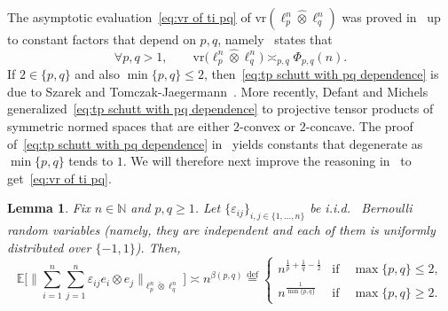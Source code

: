 \documentclass[11pt,reqno]{amsart}
\renewcommand{\le}{\leqslant}
\renewcommand{\ge}{\geqslant}
\newcommand{\vr}{\mathrm{vr}}
\newcommand{\n}{\{1,\ldots,n\}}
\newcommand{\e}{\varepsilon}
\newtheorem{lemma}[theorem]{Lemma}
\theoremstyle{remark}
\newcommand{\E}{\mathbb{ E}}
\newcommand{\N}{\mathbb N}
\newcommand{\eqdef}{\stackrel{\mathrm{def}}{=}}
\renewcommand{\1}{\mathbf 1}
\newcommand{\tp}{\hat{\otimes}}
\newcommand{\ti}{\check{\otimes}}
\begin{document}

The asymptotic evaluation~\eqref{eq:vr of ti pq} of $\vr(\ell_p^n\tp \ell_q^n)$ was proved in~\cite{Sch82} up to constant factors that depend on $p,q$, namely~\cite[Theorem~3.1]{Sch82}  states that
\begin{equation}\label{eq:tp schutt with pq dependence}
\forall p,q>1,\qquad \vr\big(\ell_p^n\tp \ell_q^n\big)\asymp_{p,q} \Phi_{p,q}(n).
\end{equation}
If $2\in \{p,q\}$ and also $\min\{p,q\}\le 2$, then~\eqref{eq:tp schutt with pq dependence} is due to Szarek and Tomczak-Jaegermann~\cite{ST-J80}. More recently, Defant and Michels~\cite{DM05}  generalized~\eqref{eq:tp schutt with pq dependence} to projective tensor products of  symmetric normed  spaces that are either $2$-convex or $2$-concave. The proof of~\eqref{eq:tp schutt with pq dependence} in~\cite{Sch82} yields constants that degenerate as $\min\{p,q\}$ tends to $1$. We will therefore next improve the reasoning in~\cite{Sch82} to  get~\eqref{eq:vr of ti pq}.


\begin{lemma}\label{lem:bernoulli chevet} Fix $n\in \N$ and $p,q\ge 1$. Let $\{\e_{ij}\}_{i,j\in \n}$ be i.i.d.~ Bernoulli random variables (namely, they are independent and each of them is uniformly distributed over $\{-1,1\}$). Then,
\begin{equation}\label{eq:bernoulli chevet}
\E \bigg[\Big\|\sum_{i=1}^n\sum_{j=1}^n\e_{ij} e_i\otimes e_j\Big\|_{\ell_p^n\ti\ell_q^n}\bigg]\asymp n^{\beta(p,q)}\eqdef \left\{\begin{array}{ll}n^{\frac{1}{p}+\frac{1}{q}-\frac12} &\mathrm{if}\quad \max\{p,q\}\le 2,\\
n^{\frac{1}{\min\{p,q\}}}&\mathrm{if}\quad \max\{p,q\}\ge 2.\end{array}\right.
\end{equation}
\end{lemma}
\end{document}
